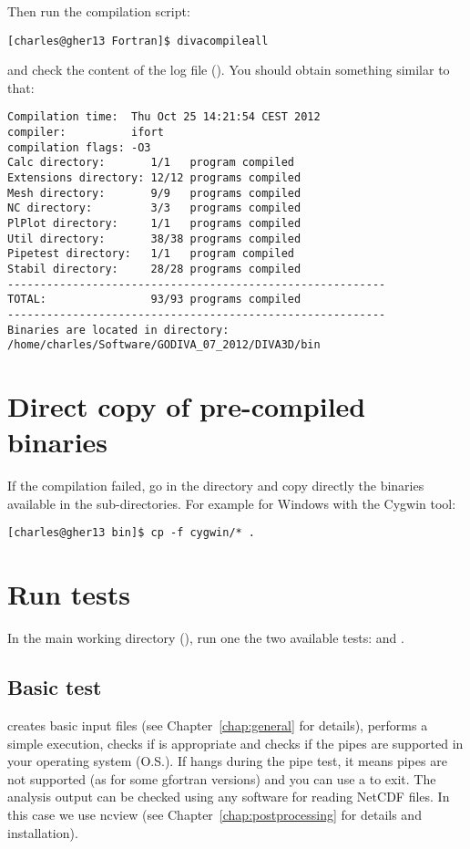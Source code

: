 Then run the compilation script: 
\begin{lstlisting}[style=Bash]
[charles@gher13 Fortran]$ divacompileall
\end{lstlisting}
and check the content of the log file (). You should obtain something similar to that:
\begin{verbatim}
Compilation time:  Thu Oct 25 14:21:54 CEST 2012
compiler:          ifort
compilation flags: -O3
Calc directory:       1/1   program compiled
Extensions directory: 12/12 programs compiled
Mesh directory:       9/9   programs compiled
NC directory:         3/3   programs compiled
PlPlot directory:     1/1   programs compiled
Util directory:       38/38 programs compiled
Pipetest directory:   1/1   program compiled
Stabil directory:     28/28 programs compiled
----------------------------------------------------------
TOTAL:                93/93 programs compiled
----------------------------------------------------------
Binaries are located in directory:
/home/charles/Software/GODIVA_07_2012/DIVA3D/bin
\end{verbatim}

\section{Direct copy of pre-compiled binaries}

If the compilation failed, go in the  directory and copy directly the binaries available in the sub-directories. For example for Windows with the Cygwin tool:
\begin{lstlisting}[style=Bash]
[charles@gher13 bin]$ cp -f cygwin/* .
\end{lstlisting}

\section{Run tests\label{sec:divatest}}

In the main working directory (), run one the two available tests:  and . 


\subsection{Basic test}

 creates basic input files (see Chapter~\ref{chap:general} for details), performs a simple \diva execution, checks if  is appropriate and checks if the pipes are supported in your operating system (O.S.). If  hangs during the pipe test, it means pipes are not supported (as for some gfortran versions) and you can use a  to exit. The analysis output can be checked using any software for reading NetCDF files. In this case we use ncview (see Chapter~\ref{chap:postprocessing} for details and installation). 

